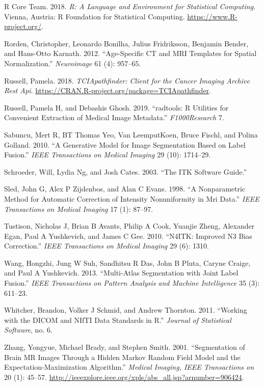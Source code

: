 \documentclass[]{elsarticle} %
\begin{document}
\leavevmode\hypertarget{ref-R}{}%
R Core Team. 2018. \emph{R: A Language and Environment for Statistical Computing}. Vienna, Austria: R Foundation for Statistical Computing. \url{https://www.R-project.org/}.

\leavevmode\hypertarget{ref-rorden2012age}{}%
Rorden, Christopher, Leonardo Bonilha, Julius Fridriksson, Benjamin Bender, and Hans-Otto Karnath. 2012. ``Age-Specific CT and MRI Templates for Spatial Normalization.'' \emph{Neuroimage} 61 (4): 957--65.

\leavevmode\hypertarget{ref-TCIApathfinder}{}%
Russell, Pamela. 2018. \emph{TCIApathfinder: Client for the Cancer Imaging Archive Rest Api}. \url{https://CRAN.R-project.org/package=TCIApathfinder}.

\leavevmode\hypertarget{ref-radtools}{}%
Russell, Pamela H, and Debashis Ghosh. 2019. ``radtools: R Utilities for Convenient Extraction of Medical Image Metadata.'' \emph{F1000Research} 7.

\leavevmode\hypertarget{ref-sabuncu2010generative}{}%
Sabuncu, Mert R, BT Thomas Yeo, Van LeemputKoen, Bruce Fischl, and Polina Golland. 2010. ``A Generative Model for Image Segmentation Based on Label Fusion.'' \emph{IEEE Transactions on Medical Imaging} 29 (10): 1714--29.

\leavevmode\hypertarget{ref-itk}{}%
Schroeder, Will, Lydia Ng, and Josh Cates. 2003. ``The ITK Software Guide.''

\leavevmode\hypertarget{ref-sled1998nonparametric}{}%
Sled, John G, Alex P Zijdenbos, and Alan C Evans. 1998. ``A Nonparametric Method for Automatic Correction of Intensity Nonuniformity in Mri Data.'' \emph{IEEE Transactions on Medical Imaging} 17 (1): 87--97.

\leavevmode\hypertarget{ref-n4}{}%
Tustison, Nicholas J, Brian B Avants, Philip A Cook, Yuanjie Zheng, Alexander Egan, Paul A Yushkevich, and James C Gee. 2010. ``N4ITK: Improved N3 Bias Correction.'' \emph{IEEE Transactions on Medical Imaging} 29 (6): 1310.

\leavevmode\hypertarget{ref-malf}{}%
Wang, Hongzhi, Jung W Suh, Sandhitsu R Das, John B Pluta, Caryne Craige, and Paul A Yushkevich. 2013. ``Multi-Atlas Segmentation with Joint Label Fusion.'' \emph{IEEE Transactions on Pattern Analysis and Machine Intelligence} 35 (3): 611--23.

\leavevmode\hypertarget{ref-orodicom}{}%
Whitcher, Brandon, Volker J Schmid, and Andrew Thornton. 2011. ``Working with the DICOM and NIfTI Data Standards in R.'' \emph{Journal of Statistical Software}, no. 6.

\leavevmode\hypertarget{ref-zhang_segmentation_2001}{}%
Zhang, Yongyue, Michael Brady, and Stephen Smith. 2001. ``Segmentation of Brain MR Images Through a Hidden Markov Random Field Model and the Expectation-Maximization Algorithm.'' \emph{Medical Imaging, IEEE Transactions on} 20 (1): 45--57. \url{http://ieeexplore.ieee.org/xpls/abs_all.jsp?arnumber=906424}.
\end{document}
